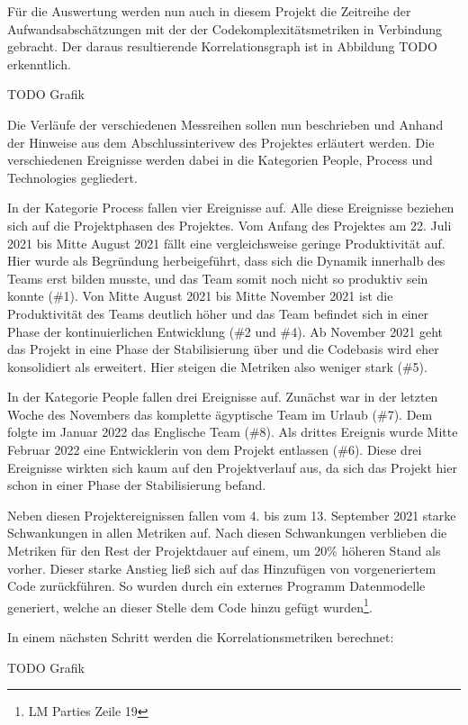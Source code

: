 Für die Auswertung werden nun auch in diesem Projekt die Zeitreihe der
Aufwandsabschätzungen mit der der Codekomplexitätsmetriken in Verbindung
gebracht. Der daraus resultierende Korrelationsgraph ist in Abbildung TODO
erkenntlich.

TODO Grafik

Die Verläufe der verschiedenen Messreihen sollen nun beschrieben und
Anhand der Hinweise aus dem Abschlussinterivew des Projektes erläutert
werden. Die verschiedenen Ereignisse werden dabei in die Kategorien
People, Process und Technologies gegliedert.

In der Kategorie Process fallen vier Ereignisse auf. Alle diese
Ereignisse beziehen sich auf die Projektphasen des Projektes. Vom Anfang
des Projektes am 22. Juli 2021 bis Mitte August 2021 fällt eine
vergleichsweise geringe Produktivität auf. Hier wurde als Begründung
herbeigeführt, dass sich die Dynamik innerhalb des Teams erst bilden
musste, und das Team somit noch nicht so produktiv sein konnte (\#1). Von Mitte August 2021 bis Mitte
November 2021 ist die Produktivität des Teams deutlich höher und das
Team befindet sich in einer Phase der kontinuierlichen Entwicklung (\#2
und \#4). Ab November 2021
geht das Projekt in eine Phase der Stabilisierung über und die Codebasis
wird eher konsolidiert als erweitert. Hier steigen die Metriken also
weniger stark (\#5).

In der Kategorie People fallen drei Ereignisse auf. Zunächst war in der
letzten Woche des Novembers das komplette ägyptische Team im Urlaub (\#7). Dem folgte im Januar 2022 das Englische Team
(\#8). Als drittes Ereignis wurde Mitte Februar
2022 eine Entwicklerin von dem Projekt entlassen (\#6). Diese drei Ereignisse wirkten sich kaum auf
den Projektverlauf aus, da sich das Projekt hier schon in einer Phase
der Stabilisierung befand.

Neben diesen Projektereignissen fallen vom 4. bis zum 13. September 2021
starke Schwankungen in allen Metriken auf. Nach diesen Schwankungen
verblieben die Metriken für den Rest der Projektdauer auf einem, um 20\%
höheren Stand als vorher. Dieser starke Anstieg ließ sich auf das
Hinzufügen von vorgeneriertem Code zurückführen. So wurden durch ein
externes Programm Datenmodelle generiert, welche an dieser Stelle dem
Code hinzu gefügt wurden\footnote{LM Parties Zeile 19}.

In einem nächsten Schritt werden die Korrelationsmetriken berechnet:

TODO Grafik

